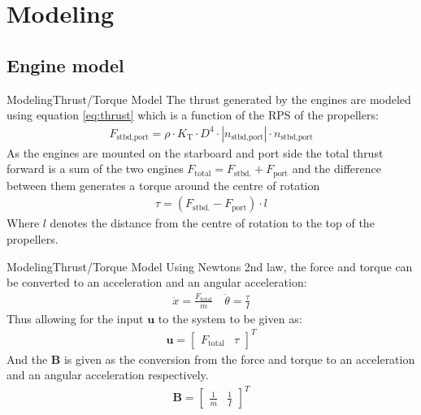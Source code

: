 \documentclass[10pt]{beamer}
\begin{document}

\section{Modeling}
\subsection{Engine model}
\begin{frame}{Modeling}{Thrust/Torque Model}
The thrust generated by the engines are modeled using equation \ref{eq:thrust} which is a function of the RPS of the propellers:
\begin{align}
F_\text{stbd,port} = \rho \cdot K_\text{T} \cdot D^4 \cdot |n_\text{stbd,port}| \cdot n_\text{stbd,port}
\label{eq:thrust}
\end{align}
As the engines are mounted on the starboard and port side the total thrust forward is a sum of the two engines $F_\text{total} = F_\text{stbd.} + F_\text{port}$ and the difference between them generates a torque around the centre of rotation
\begin{align}
\tau = (F_\text{stbd.} - F_\text{port}) \cdot l
\end{align}
Where $l$ denotes the distance from the centre of rotation to the top of the propellers.
\end{frame}

\begin{frame}{Modeling}{Thrust/Torque Model}
Using Newtons 2nd law, the force and torque can be converted to an acceleration and an angular acceleration:
\begin{align}
\ddot{x} = \frac{F_\text{total}}{m} \quad \ddot{\theta} = \frac{\tau}{I}
\end{align}
Thus allowing for the input $\mathbf{u}$ to the system to be given as:
\begin{align}
\mathbf{u} = \begin{bmatrix}
F_\text{total} & \tau
\end{bmatrix}^T
\end{align}
And the $\mathbf{B}$ is given as the conversion from the force and torque to an acceleration and an angular acceleration respectively.
\begin{align}
\mathbf{B} = \begin{bmatrix}
\frac{1}{m} & \frac{1}{I}
\end{bmatrix}^T
\end{align}
\end{frame}
\end{document}
